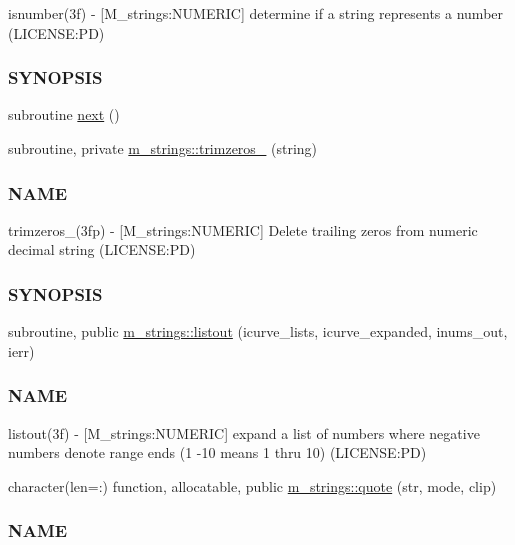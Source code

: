 \begin{DoxyCompactItemize}
\begin{DoxyCompactList}
isnumber(3f) -\/ \mbox{[}M\+\_\+strings\+:N\+U\+M\+E\+R\+IC\mbox{]} determine if a string represents a number (L\+I\+C\+E\+N\+SE\+:PD) \subsubsection*{S\+Y\+N\+O\+P\+S\+IS}\end{DoxyCompactList}\item 
subroutine \mbox{\hyperlink{M__strings_8f90_a4ca03eba3c35c5b7fbc751d60bc4d1e9}{next}} ()
\item 
subroutine, private \mbox{\hyperlink{namespacem__strings_aedbeefa963a63edc16b10e2a833eb609}{m\+\_\+strings\+::trimzeros\+\_\+}} (string)
\begin{DoxyCompactList}\small\item\em \subsubsection*{N\+A\+ME}

trimzeros\+\_\+(3fp) -\/ \mbox{[}M\+\_\+strings\+:N\+U\+M\+E\+R\+IC\mbox{]} Delete trailing zeros from numeric decimal string (L\+I\+C\+E\+N\+SE\+:PD) \subsubsection*{S\+Y\+N\+O\+P\+S\+IS}\end{DoxyCompactList}\item 
subroutine, public \mbox{\hyperlink{namespacem__strings_a81b4b7f4f301b9e17604adbcace58d0c}{m\+\_\+strings\+::listout}} (icurve\+\_\+lists, icurve\+\_\+expanded, inums\+\_\+out, ierr)
\begin{DoxyCompactList}\small\item\em \subsubsection*{N\+A\+ME}

listout(3f) -\/ \mbox{[}M\+\_\+strings\+:N\+U\+M\+E\+R\+IC\mbox{]} expand a list of numbers where negative numbers denote range ends (1 -\/10 means 1 thru 10) (L\+I\+C\+E\+N\+SE\+:PD) \end{DoxyCompactList}\item 
character(len=\+:) function, allocatable, public \mbox{\hyperlink{namespacem__strings_a3596a4ec755ac897a1dbc0b225d5266a}{m\+\_\+strings\+::quote}} (str, mode, clip)
\begin{DoxyCompactList}\small\item\em \subsubsection*{N\+A\+ME}


\end{DoxyCompactList}
\end{DoxyCompactItemize}
